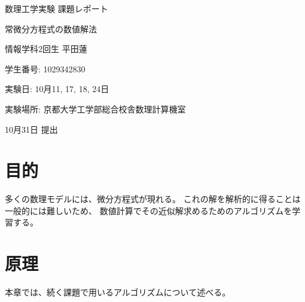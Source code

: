 \documentclass[a4j, titlepage]{jsarticle}
\numberwithin{equation}{section}
\begin{document}
\begin{titlepage}
    \begin{center}
        {\Large 数理工学実験 課題レポート}

        \vspace*{180truept}

        {\Huge 常微分方程式の数値解法}

        \vspace{160truept}

        {\Large 情報学科2回生 平田蓮}

        \vspace{10truept}

        {\large 学生番号: 1029342830}

        \vspace{60truept}

        {\large 実験日: 10月11, 17, 18, 24日}

        \vspace{10truept}

        {\large 実験場所: 京都大学工学部総合校舎数理計算機室}

        \vspace{60truept}

        {\large 10月31日 提出}
    \end{center}
\end{titlepage}

\tableofcontents
\clearpage

\section{目的}
    多くの数理モデルには、微分方程式が現れる。
    これの解を解析的に得ることは一般的には難しいため、
    数値計算でその近似解求めるためのアルゴリズムを学習する。

\section{原理}
    本章では、続く課題で用いるアルゴリズムについて述べる。
\end{document}
